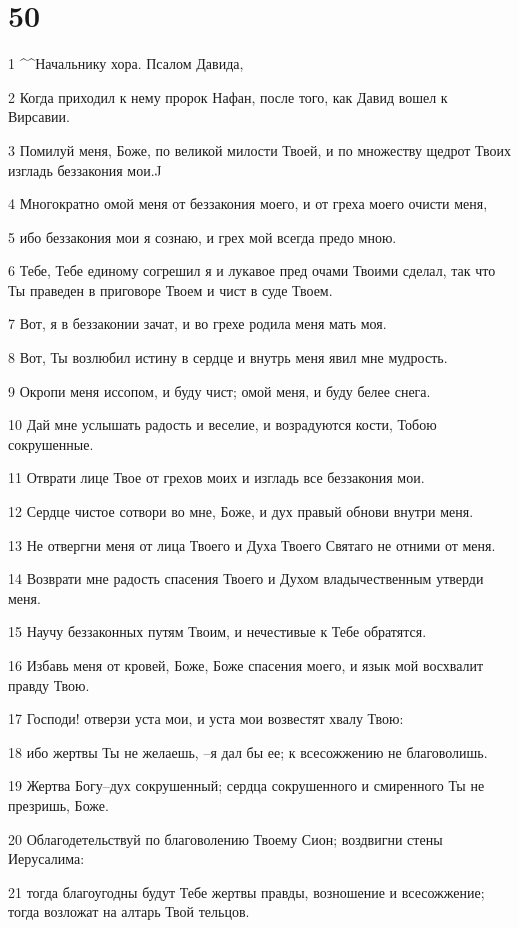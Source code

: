 \chapter{50}

\par 1 ^^Начальнику хора. Псалом Давида,
\par 2 Когда приходил к нему пророк Нафан, после того, как Давид вошел к Вирсавии.
\par 3 Помилуй меня, Боже, по великой милости Твоей, и по множеству щедрот Твоих изгладь беззакония мои.^^
\par 4 Многократно омой меня от беззакония моего, и от греха моего очисти меня,
\par 5 ибо беззакония мои я сознаю, и грех мой всегда предо мною.
\par 6 Тебе, Тебе единому согрешил я и лукавое пред очами Твоими сделал, так что Ты праведен в приговоре Твоем и чист в суде Твоем.
\par 7 Вот, я в беззаконии зачат, и во грехе родила меня мать моя.
\par 8 Вот, Ты возлюбил истину в сердце и внутрь меня явил мне мудрость.
\par 9 Окропи меня иссопом, и буду чист; омой меня, и буду белее снега.
\par 10 Дай мне услышать радость и веселие, и возрадуются кости, Тобою сокрушенные.
\par 11 Отврати лице Твое от грехов моих и изгладь все беззакония мои.
\par 12 Сердце чистое сотвори во мне, Боже, и дух правый обнови внутри меня.
\par 13 Не отвергни меня от лица Твоего и Духа Твоего Святаго не отними от меня.
\par 14 Возврати мне радость спасения Твоего и Духом владычественным утверди меня.
\par 15 Научу беззаконных путям Твоим, и нечестивые к Тебе обратятся.
\par 16 Избавь меня от кровей, Боже, Боже спасения моего, и язык мой восхвалит правду Твою.
\par 17 Господи! отверзи уста мои, и уста мои возвестят хвалу Твою:
\par 18 ибо жертвы Ты не желаешь, --я дал бы ее; к всесожжению не благоволишь.
\par 19 Жертва Богу--дух сокрушенный; сердца сокрушенного и смиренного Ты не презришь, Боже.
\par 20 Облагодетельствуй по благоволению Твоему Сион; воздвигни стены Иерусалима:
\par 21 тогда благоугодны будут Тебе жертвы правды, возношение и всесожжение; тогда возложат на алтарь Твой тельцов.

